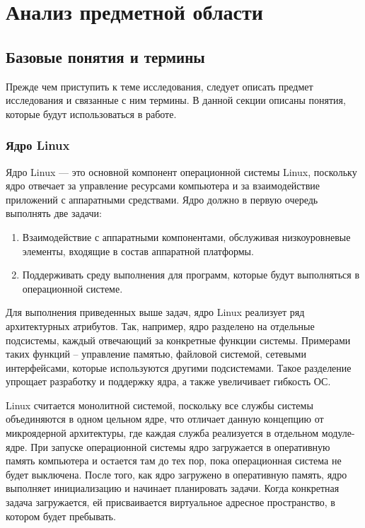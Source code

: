 \section{Анализ предметной области}

\subsection{Базовые понятия и термины}
Прежде чем приступить к теме исследования, следует описать предмет исследования и связанные с ним термины.
В данной секции описаны понятия, которые будут использоваться в работе.

\subsubsection{Ядро Linux}
Ядро Linux — это основной компонент операционной системы Linux,
поскольку ядро отвечает за управление ресурсами компьютера и за взаимодействие приложений с аппаратными средствами.
Ядро должно в первую очередь выполнять две задачи:
\begin{enumerate}
    \item Взаимодействие с аппаратными компонентами, обслуживая низкоуровневые элементы, входящие в состав аппаратной платформы.
    \item Поддерживать среду выполнения для программ, которые будут выполняться в операционной системе.
\end{enumerate}

Для выполнения приведенных выше задач, ядро Linux реализует ряд архитектурных атрибутов.
Так, например, ядро разделено на отдельные подсистемы, каждый отвечающий за конкретные функции системы.
Примерами таких функций -- управление памятью, файловой системой, сетевыми интерфейсами, которые используются другими подсистемами.
Такое разделение упрощает разработку и поддержку ядра, а также увеличивает гибкость ОС.

Linux считается монолитной системой, поскольку все службы системы объединяются в одном цельном ядре,
что отличает данную концепцию от микроядерной архитектуры,
где каждая служба реализуется в отдельном модуле-ядре.
При запуске операционной системы ядро загружается в оперативную память компьютера и остается там до тех пор,
пока операционная система не будет выключена.
После того, как ядро загружено в оперативную память, ядро выполняет инициализацию и начинает планировать задачи.
Когда конкретная задача загружается, ей присваивается виртуальное адресное пространство, в котором будет пребывать.\vspace{0.5cm}\\

